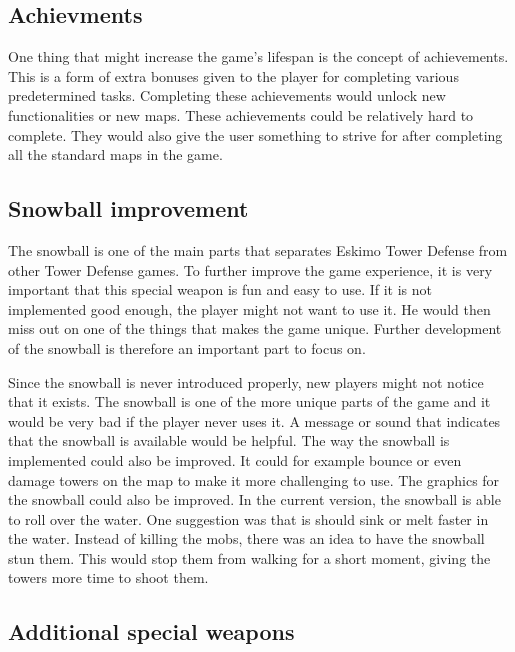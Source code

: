\subsection{Achievments}

One thing that might increase the game's lifespan is the concept of achievements. This is a form of extra bonuses given to the player for completing various predetermined tasks. Completing these achievements would unlock new functionalities or new maps. These achievements could be relatively hard to complete. They would also give the user something to strive for after completing all the standard maps in the game. 
\subsection{Snowball improvement}

The snowball is one of the main parts that separates Eskimo Tower Defense from other Tower Defense games. To further improve the game experience, it is very important that this special weapon is fun and easy to use. If it is not implemented good enough, the player might not want to use it. He would then miss out on one of the things that makes the game unique. Further development of the snowball is therefore an important part to focus on.

Since the snowball is never introduced properly, new players might not notice that it exists. The snowball is one of the more unique parts of the game and it would be very bad if the player never uses it. A message or sound that indicates that the snowball is available would be helpful. The way the snowball is implemented could also be improved. It could for example bounce or even damage towers on the map to make it more challenging to use. The graphics for the snowball could also be improved. In the current version, the snowball is able to roll over the water. One suggestion was that is should sink or melt faster in the water. Instead of killing the mobs, there was an idea to have the snowball stun them. This would stop them from walking for a short moment, giving the towers more time to shoot them.
\subsection{Additional special weapons}

